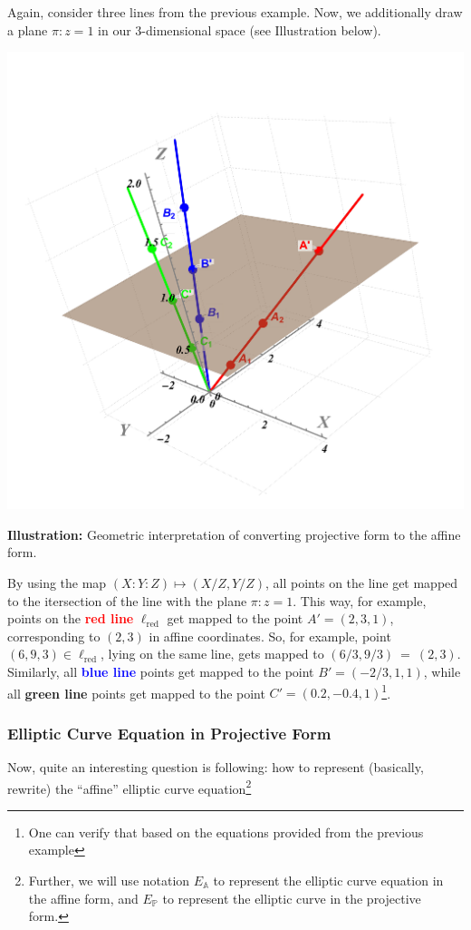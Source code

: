 \documentclass[../lecture-notes.tex]{subfiles}
\begin{document}
\begin{example}
    Again, consider three lines from the previous example. Now, we additionally draw a plane $\pi: z=1$ in our 3-dimensional space (see Illustration below).

    \begin{center}
        \includegraphics[trim={100 100 100 200}, width=0.65\linewidth, clip]{images/lecture_4/line_2.pdf}
        
        \small{\textbf{Illustration:} Geometric interpretation of converting projective form to the affine form.}
    \end{center}

    By using the map $(X:Y:Z) \mapsto (X/Z,Y/Z)$, all points on the line get mapped to the itersection of the line with the plane $\pi: z=1$. This way, for example, points on the \textcolor{red}{\textbf{red line}} $\ell_{\text{red}}$ get mapped to the point $A'=(2,3,1)$, corresponding to $(2,3)$ in affine coordinates. So, for example, point $(6,9,3) \in \ell_{\text{red}}$, lying on the same line, gets mapped to $(6/3,9/3)~=~(2,3)$.
    Similarly, all \textcolor{blue}{\textbf{blue line}} points get mapped to the point $B'=(-2/3,1,1)$, while all \textcolor{green!60!black}{\textbf{green line}} points get mapped to the point $C'=(0.2,-0.4,1)$\footnote{One can verify that based on the equations provided from the previous example}.
\end{example}

\subsubsection{Elliptic Curve Equation in Projective Form}

Now, quite an interesting question is following: how to represent (basically, rewrite) the ``affine'' elliptic curve equation\footnote{Further, we will use notation $E_{\mathbb{A}}$ to represent the elliptic curve equation in the affine form, and $E_{\mathbb{P}}$ to represent the elliptic curve in the projective form.}
\end{document}
